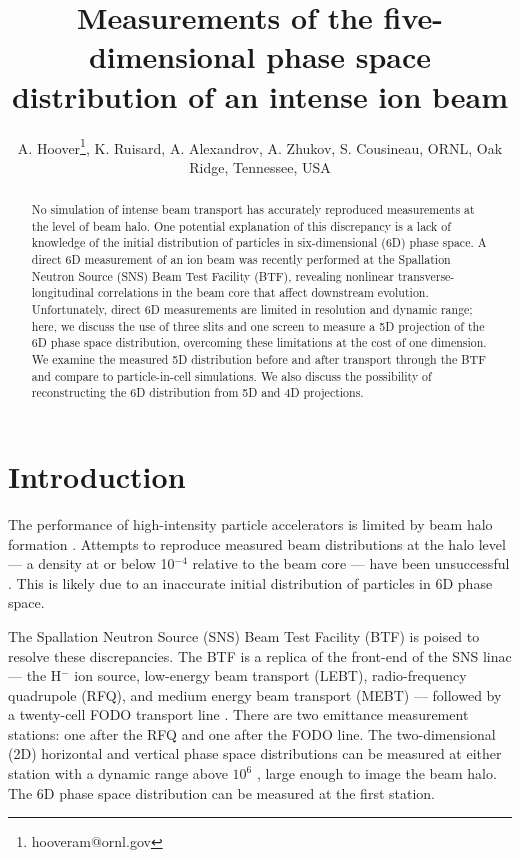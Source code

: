 \documentclass[letterpaper,
               keeplastbox,
               nospread,
               biblatex,
              ]{jacow}
\begin{document}
\title{Measurements of the five-dimensional phase space distribution of an intense ion beam}

\author{A. Hoover\thanks{hooveram@ornl.gov}, K. Ruisard, A. Alexandrov, A. Zhukov, S. Cousineau, ORNL, Oak Ridge, Tennessee, USA}
	
\maketitle

%
\begin{abstract}
No simulation of intense beam transport has accurately reproduced measurements at the level of beam halo. One potential explanation of this discrepancy is a lack of knowledge of the initial distribution of particles in six-dimensional (6D) phase space. A direct 6D measurement of an ion beam was recently performed at the Spallation Neutron Source (SNS) Beam Test Facility (BTF), revealing nonlinear transverse-longitudinal correlations in the beam core that affect downstream evolution. Unfortunately, direct 6D measurements are limited in resolution and dynamic range; here, we discuss the use of three slits and one screen to measure a 5D projection of the 6D phase space distribution, overcoming these limitations at the cost of one dimension. We examine the measured 5D distribution before and after transport through the BTF and compare to particle-in-cell simulations. We also discuss the possibility of reconstructing the 6D distribution from 5D and 4D projections.
\end{abstract}

\section{Introduction}


The performance of high-intensity particle accelerators is limited by beam halo formation \cite{}. Attempts to reproduce measured beam distributions at the halo level — a density at or below 10$^{-4}$ relative to the beam core — have been unsuccessful \cite{LEDA, Groening}. This is likely due to an inaccurate initial distribution of particles in 6D phase space. 

The Spallation Neutron Source (SNS) Beam Test Facility (BTF) is poised to resolve these discrepancies. The BTF is a replica of the front-end of the SNS linac — the H$^-$ ion source, low-energy beam transport (LEBT), radio-frequency quadrupole (RFQ), and medium energy beam transport (MEBT) — followed by a twenty-cell FODO transport line \cite{}. There are two emittance measurement stations: one after the RFQ and one after the FODO line. The two-dimensional (2D) horizontal and vertical phase space distributions can be measured at either station with a dynamic range above $10^6$ \cite{Alexandrov2020}, large enough to image the beam halo. The 6D phase space distribution can be measured at the first station. 
\end{document}
